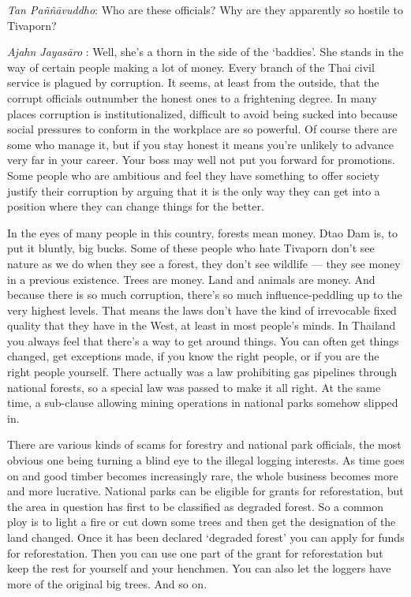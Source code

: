 \emph{Tan Paññāvuddho}: Who are these officials? Why are they apparently
so hostile to Tivaporn?

\emph{Ajahn Jayasāro }: Well, she's a thorn in the side of the
`baddies'. She stands in the way of certain people making a lot of
money. Every branch of the Thai civil service is plagued by corruption.
It seems, at least from the outside, that the corrupt officials
outnumber the honest ones to a frightening degree. In many places
corruption is institutionalized, difficult to avoid being sucked into
because social pressures to conform in the workplace are so powerful. Of
course there are some who manage it, but if you stay honest it means
you're unlikely to advance very far in your career. Your boss may well
not put you forward for promotions. Some people who are ambitious and
feel they have something to offer society justify their corruption by
arguing that it is the only way they can get into a position where they
can change things for the better.

In the eyes of many people in this country, forests mean money. Dtao Dam
is, to put it bluntly, big bucks. Some of these people who hate Tivaporn
don't see nature as we do when they see a forest, they don't see
wildlife --- they see money in a previous existence. Trees are money.
Land and animals are money. And because there is so much corruption,
there's so much influence-peddling up to the very highest levels. That
means the laws don't have the kind of irrevocable fixed quality that
they have in the West, at least in most people's minds. In Thailand you
always feel that there's a way to get around things. You can often get
things changed, get exceptions made, if you know the right people, or if
you are the right people yourself. There actually was a law prohibiting
gas pipelines through national forests, so a special law was passed to
make it all right. At the same time, a sub-clause allowing mining
operations in national parks somehow slipped in.

There are various kinds of scams for forestry and national park
officials, the most obvious one being turning a blind eye to the illegal
logging interests. As time goes on and good timber becomes increasingly
rare, the whole business becomes more and more lucrative. National parks
can be eligible for grants for reforestation, but the area in question
has first to be classified as degraded forest. So a common ploy is to
light a fire or cut down some trees and then get the designation of the
land changed. Once it has been declared `degraded forest' you can apply
for funds for reforestation. Then you can use one part of the grant for
reforestation but keep the rest for yourself and your henchmen. You can
also let the loggers have more of the original big trees. And so on.

